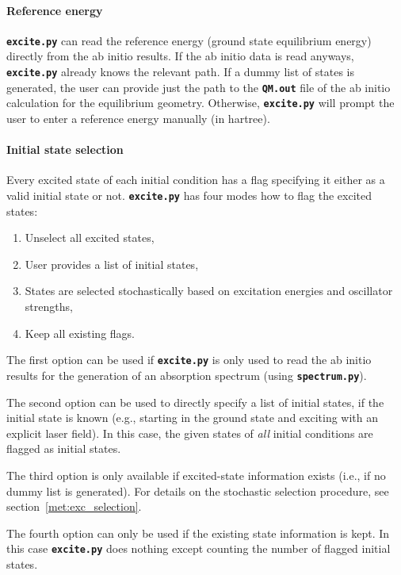 \documentclass[a4paper,11pt,DIV=15,openany,twoside=false]{scrbook}
\newcommand{\ttt}[1]{\textbf{\texttt{#1}}}
\begin{document}
\paragraph{Reference energy}

\ttt{excite.py} can read the reference energy (ground state equilibrium energy) directly from the ab initio results. If the ab initio data is read anyways, \ttt{excite.py} already knows the relevant path. If a dummy list of states is generated, the user can provide just the path to the \ttt{QM.out} file of the ab initio calculation for the equilibrium geometry. Otherwise, \ttt{excite.py} will prompt the user to enter a reference energy manually (in hartree).

\paragraph{Initial state selection}

Every excited state of each initial condition has a flag specifying it either as a valid initial state or not. \ttt{excite.py} has four modes how to flag the excited states:
\begin{enumerate}
  \item Unselect all excited states,
  \item User provides a list of initial states,
  \item States are selected stochastically based on excitation energies and oscillator strengths,
  \item Keep all existing flags.
\end{enumerate}
The first option can be used if \ttt{excite.py} is only used to read the ab initio results for the generation of an absorption spectrum (using \ttt{spectrum.py}). 

The second option can be used to directly specify a list of initial states, if the initial state is known (e.g., starting in the ground state and exciting with an explicit laser field). In this case, the given states of \textit{all} initial conditions are flagged as initial states.

The third option is only available if excited-state information exists (i.e., if no dummy list is generated). For details on the stochastic selection procedure, see section~\ref{met:exc_selection}. 

The fourth option can only be used if the existing state information is kept. In this case \ttt{excite.py} does nothing except counting the number of flagged initial states.
\end{document}
